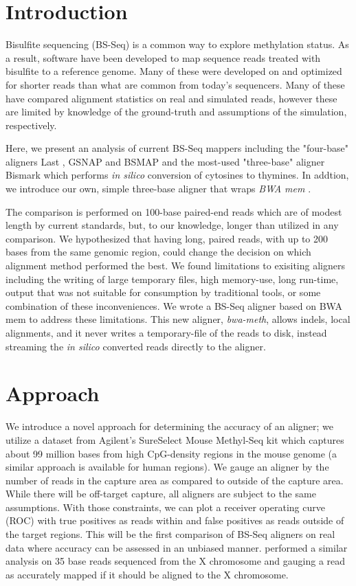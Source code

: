 \documentclass{bioinfo}
\begin{document}
\section{Introduction}
Bisulfite sequencing (BS-Seq) is a common way to explore methylation status.
As a result, software \citep{frithlast,methylcoder,gsnap,krueger2011,bsmap}
have been developed to map sequence reads treated with bisulfite to a reference genome.
Many of these were developed on and optimized for shorter reads
than what are common from today's sequencers. Many of these have compared alignment
statistics on real \citep{methylcoder,bsmap} and simulated \citep{frithlast} reads,
however these are limited by knowledge of the ground-truth and assumptions of
the simulation, respectively.

Here, we present an analysis of current BS-Seq mappers including the "four-base" aligners
Last \citep{frithlast}, GSNAP \citep{gsnap} and BSMAP \citep{bsmap} and the most-used
"three-base" aligner Bismark \citep{krueger2011} which performs \emph{in silico} conversion
of cytosines to thymines. In addtion, we introduce our
own, simple three-base aligner that wraps \textit{BWA mem} \citep{bwamem}.

The comparison is performed on 100-base paired-end reads
which are of modest length by current standards, but, to our knowledge, longer than
utilized in any comparison. We hypothesized that having long, paired reads, with up
to 200 bases from the same genomic region, could change the decision on which
alignment method performed the best. 
We found limitations to exisiting aligners including the writing of large temporary
files, high memory-use, long run-time, output that was not suitable for consumption by
traditional tools, or some combination of these inconveniences. We wrote
a BS-Seq aligner based on BWA mem \citep{bwamem} to address these
limitations. This new aligner, 
\textit{bwa-meth}, allows indels, local alignments, and it never writes a
temporary-file of the reads to disk, instead streaming the \emph{in silico} converted
reads directly to the aligner.

\section{Approach}
We introduce a novel approach for determining the accuracy of an aligner;
we utilize a dataset from Agilent's SureSelect Mouse Methyl-Seq kit which
captures about
99 million bases from high CpG-density regions in the mouse genome (a similar
approach is available for human regions).
We gauge an aligner by the number of reads in the capture area as compared
to outside of the capture area. While there will be off-target capture, all
aligners are subject to the same assumptions. With those constraints, we can
plot a receiver operating curve (ROC) with true positives as reads within
and false positives as reads outside of the target regions.
This will be the first comparison of BS-Seq aligners on real data where accuracy
can be assessed in an unbiased manner.
\citealp{shrestha} performed a similar analysis on 35 base reads sequenced from
the X chromosome and gauging a read as accurately mapped if it should be aligned
to the X chromosome.
\end{document}
